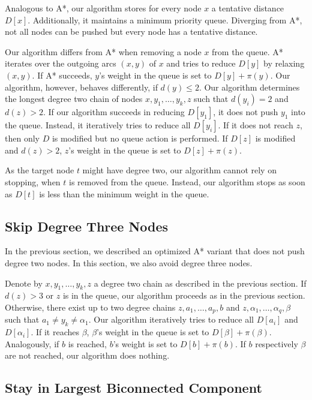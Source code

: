 \documentclass[letterpaper]{article} %
\begin{document}
Analogous to A*, our algorithm stores for every node $x$ a tentative distance $D[x]$.
Additionally, it maintains a minimum priority queue.
Diverging from A*, not all nodes can be pushed but every node has a tentative distance.

Our algorithm differs from A* when removing a node $x$ from the queue.
A* iterates over the outgoing arcs $(x,y)$ of $x$ and tries to reduce $D[y]$ by relaxing $(x,y)$.
If A* succeeds, $y$'s weight in the queue is set to $D[y]+\pi(y)$.
Our algorithm, however, behaves differently, if $d(y)\le 2$.
Our algorithm determines the longest degree two chain of nodes $x,y_1,\ldots, y_k, z$ such that $d(y_i)=2$ and $d(z) > 2$.
If our algorithm succeeds in reducing $D[y_1]$, it does not push $y_1$ into the queue.
Instead, it iteratively tries to reduce all $D[y_i]$.
If it does not reach $z$, then only $D$ is modified but no queue action is performed.
If $D[z]$ is modified and $d(z)>2$, $z$'s weight in the queue is set to $D[z]+\pi(z)$.

As the target node $t$ might have degree two, our algorithm cannot rely on stopping, when $t$ is removed from the queue.
Instead, our algorithm stops as soon as $D[t]$ is less than the minimum weight in the queue.

\subsection{Skip Degree Three Nodes}

In the previous section, we described an optimized A* variant that does not push degree two nodes.
In this section, we also avoid degree three nodes.

Denote by $x,y_1,\ldots, y_k, z$ a degree two chain as described in the previous section.
If $d(z) > 3$ or $z$ is in the queue, our algorithm proceeds as in the previous section.
Otherwise, there exist up to two degree chains $z,a_1,\ldots,a_p,b$ and $z,\alpha_1,\ldots,\alpha_q,\beta$ such that $a_1\neq y_k \neq \alpha_1$.
Our algorithm iteratively tries to reduce all $D[a_i]$ and $D[\alpha_i]$.
If it reaches $\beta$, $\beta$'s weight in the queue is set to $D[\beta]+\pi(\beta)$.
Analogously, if $b$ is reached, $b$'s weight is set to $D[b]+\pi(b)$.
If $b$ respectively $\beta$ are not reached, our algorithm does nothing.

\subsection{Stay in Largest Biconnected Component}
\end{document}
